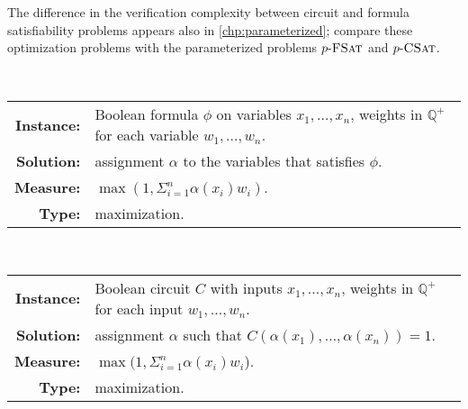 The difference in the verification complexity between circuit and formula satisfiability problems appears also in \autoref{chp:parameterized}; compare these optimization problems with the parameterized problems $p \textnormal{-} \textsc{FSat}$ and $p \textnormal{-} \textsc{CSat}$.

\begin{definition}
  \mbox{} \\
  \begin{tabular}{r p{9.5cm}}
    \textbf{Instance:} & Boolean formula $\phi$ on variables $x_1, \dotsc, x_n$, weights in $\mathbb{Q}^+$ for each variable $w_1, \dotsc, w_n$. \\
    \textbf{Solution:} & assignment $\alpha$ to the variables that satisfies $\phi$. \\
    \textbf{Measure:} & $\max(1, \Sigma_{i = 1}^n \alpha(x_i) w_i)$. \\
    \textbf{Type:} & maximization.
  \end{tabular}
\end{definition}

\begin{definition}
  \mbox{} \\
  \begin{tabular}{r p{9.5cm}}
    \textbf{Instance:} & Boolean circuit $C$ with inputs $x_1, \dotsc, x_n$, weights in $\mathbb{Q}^+$ for each input $w_1, \dotsc, w_n$. \\
    \textbf{Solution:} & assignment $\alpha$ such that $C(\alpha(x_1), \dotsc, \alpha(x_n)) = 1$. \\
    \textbf{Measure:} & $\max(1, \Sigma_{i = 1}^n \alpha(x_i) w_i$). \\
    \textbf{Type:} & maximization.
  \end{tabular}
\end{definition}

